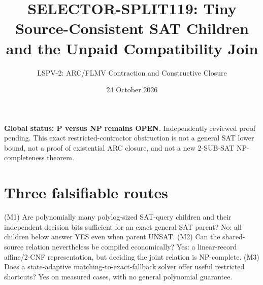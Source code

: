 \documentclass[11pt]{article}
\title{SELECTOR-SPLIT119: Tiny Source-Consistent SAT Children and the Unpaid Compatibility Join}
\author{LSPV-2: ARC/FLMV Contraction and Constructive Closure}
\date{24 October 2026}
\begin{document}
\maketitle
\noindent\textbf{Global status: P versus NP remains OPEN.} Independently reviewed proof pending. This exact restricted-contractor obstruction is not a general SAT lower bound, not a proof of existential ARC closure, and not a new 2-SUB-SAT NP-completeness theorem.
\section{Three falsifiable routes}
(M1) Are polynomially many polylog-sized SAT-query children and their independent decision bits sufficient for an exact general-SAT parent? No: all children below answer YES even when parent UNSAT. (M2) Can the shared-source relation nevertheless be compiled economically? Yes: a linear-record affine/2-CNF representation, but deciding the joint relation is NP-complete. (M3) Does a state-adaptive matching-to-exact-fallback solver offer useful restricted shortcuts? Yes on measured cases, with no general polynomial guarantee.
\end{document}
